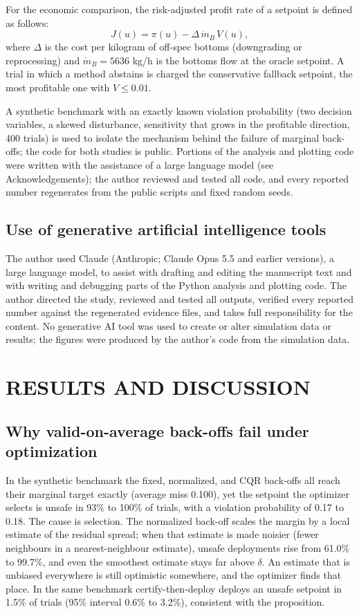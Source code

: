 \documentclass[12pt]{article}
\begin{document}
For the economic comparison, the risk-adjusted profit rate of a setpoint is defined as follows:
\begin{equation}
J(u) = \pi(u) - \Delta\, \dot m_B\, V(u),
\label{eq:J}
\end{equation}
where $\Delta$ is the cost per kilogram of off-spec bottoms (downgrading or reprocessing) and
$\dot m_B = 5636$ kg/h is the bottoms flow at the oracle setpoint. A trial in which a method
abstains is charged the conservative fallback setpoint, the most profitable one with $V \le 0.01$.

A synthetic benchmark with an exactly known violation probability (two decision variables, a skewed
disturbance, sensitivity that grows in the profitable direction, 400 trials) is used to isolate the
mechanism behind the failure of marginal back-offs; the code for both studies is public. Portions of
the analysis and plotting code were written with the assistance of a large language model (see
Acknowledgements); the author reviewed and tested all code, and every reported number regenerates
from the public scripts and fixed random seeds.

\subsection{Use of generative artificial intelligence tools}
The author used Claude (Anthropic; Claude Opus 5.5 and earlier versions), a large language model,
to assist with drafting and editing the manuscript text and with writing and debugging parts of the
Python analysis and plotting code. The author directed the study, reviewed and tested all outputs,
verified every reported number against the regenerated evidence files, and takes full
responsibility for the content. No generative AI tool was used to create or alter simulation data
or results; the figures were produced by the author's code from the simulation data.

\section{RESULTS AND DISCUSSION}

\subsection{Why valid-on-average back-offs fail under optimization}
In the synthetic benchmark the fixed, normalized, and CQR back-offs all reach their marginal
target exactly (average miss 0.100), yet the setpoint the optimizer selects is unsafe in 93\% to
100\% of trials, with a violation probability of 0.17 to 0.18. The cause is selection. The
normalized back-off scales the margin by a local estimate of the residual spread; when that
estimate is made noisier (fewer neighbours in a nearest-neighbour estimate), unsafe deployments rise
from 61.0\% to 99.7\%, and even the smoothest estimate stays far above $\delta$. An estimate that is
unbiased everywhere is still optimistic somewhere, and the optimizer finds that place. In the same
benchmark certify-then-deploy deploys an unsafe setpoint in 1.5\% of trials (95\% interval 0.6\% to
3.2\%), consistent with the proposition.
\end{document}
